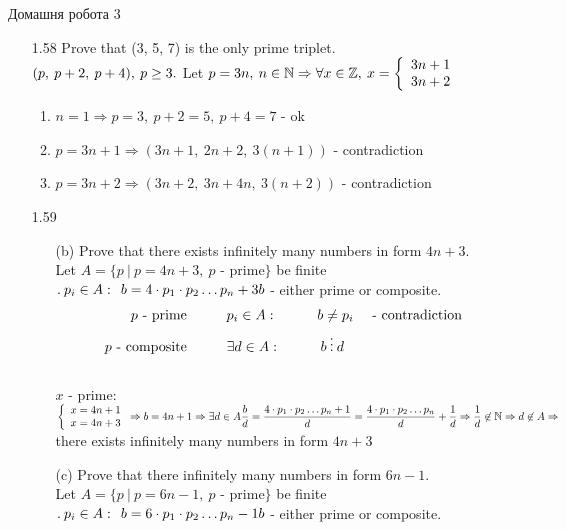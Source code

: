 \documentclass[a4paper,12pt]{article}
\newcommand\tab[1][1cm]{\hspace*{#1}}
\begin{document}
\begin{center}
{\LARGE Домашня робота 3}%
\end{center}
\begin{itemize}
	\item [1.58] Prove that (3, 5, 7) is the only prime triplet.\\
		$(p,\>p+2,\>p+4),\>p\geq3. \\$ Let $p=3n,\>n\in\mathbb{N}
		\Rightarrow \forall x\in\mathbb{Z},\>x=\left\{\begin{array}{l}
			3n+1\\3n+2
		\end{array}\right.\\$\begin{enumerate}
			\item $n=1\Rightarrow p=3,\>p+2=5,\>p+4=7$ - ok
			\item $p=3n+1\Rightarrow (3n+1,\>2n+2,\>3(n+1))$ - contradiction
			\item $p=3n+2\Rightarrow (3n+2,\>3n+4n,\>3(n+2))$ - contradiction
		\end{enumerate}
	\item [1.59] \begin{itemize} 
	\item [(b)] Prove that there exists infinitely many numbers in form $4n+3$.\\Let $A=\{p\>|\>p=4n+3,\>p$ - prime$\}$ be finite$.\>p_i\in A:\>\>b=4\cdot p_1\cdot p_2\dots p_n+3\\b$ - either prime or composite.\begin{align*}
		p\textrm{ - prime} &\tab  p_i\in A:\tab b\neq p_i&\textrm{ - contradiction}\\
		 p\textrm{ - composite} &\tab\exists d\in A:\tab b\>\vdots\>d
	\end{align*}\\$x$ - prime: $\left\{\begin{array}{l}
		x=4n+1\\x=4n+3
	\end{array}\right.\Rightarrow b=4n+1\Rightarrow\exists d\in A\\\dfrac bd=\dfrac{4\cdot p_1\cdot p_2\dots p_n+1}d=\dfrac{4\cdot p_1\cdot p_2\dots p_n}d+\dfrac1d\Rightarrow \dfrac1d\not\in \mathbb{N}\Rightarrow d\not\in A\\\Rightarrow$ there exists infinitely many numbers in form $4n+3$
	\item [(c)] Prove that there infinitely many numbers in form $6n-1$.\\Let $A=\{p\>|\>p=6n-1,\>p$ - prime$\}$ be finite$.\>p_i\in A:\>\>b=6\cdot p_1\cdot p_2\dots p_n-1\\b$ - either prime or composite.\begin{align*}

\end{align*}
\end{itemize}
\end{itemize}
\end{document}
